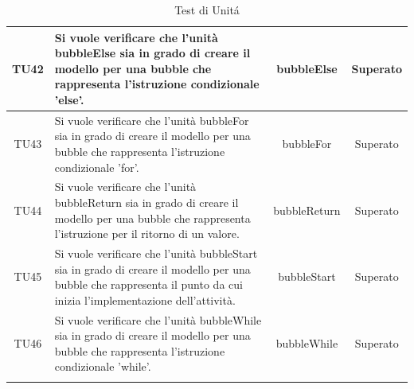 \documentclass[../PianoDiQualifica.tex]{subfiles}
\begin{document}
\begin{longtable}{|c|>{\centering}p{8cm}|c|c|}
		\hline
		\hypertarget{TU42}{TU42}&Si vuole verificare che l'unità bubbleElse sia in grado di creare il modello per una bubble che rappresenta l'istruzione condizionale 'else'. &bubbleElse  &Superato\\
		\hline
		\hypertarget{TU43}{TU43}&Si vuole verificare che l'unità bubbleFor sia in grado di creare il modello per una bubble che rappresenta l'istruzione condizionale 'for'.& bubbleFor& Superato\\
		\hline
		\hypertarget{TU44}{TU44}& Si vuole verificare che l'unità bubbleReturn sia in grado di creare il modello per una bubble che rappresenta l'istruzione per il ritorno di un valore.&  bubbleReturn&Superato\\
		\hline
		\hypertarget{TU45}{TU45}&Si vuole verificare che l'unità bubbleStart sia in grado di creare il modello per una bubble che rappresenta il punto da cui inizia l'implementazione dell'attività. & bubbleStart&Superato\\
		\hline
		\hypertarget{TU46}{TU46}&Si vuole verificare che l'unità bubbleWhile sia in grado di creare il modello per una bubble che rappresenta l'istruzione condizionale 'while'. & bubbleWhile&Superato\\
		\hline
		\caption[Test di Unit\'a]{Test di Unit\'a}
		\label{tabella:TestUnit\'a}
	\end{longtable}
\end{document}
